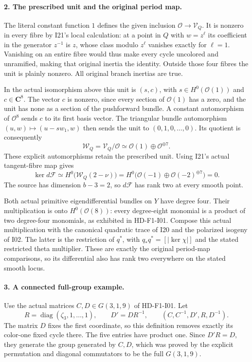 \paragraph{2. The prescribed unit and the original period map.}
The literal constant function $1$ defines the given
inclusion $\mathcal O\to\mathcal V_Q$. It is nonzero in
every fibre by I21's local calculation: at a point in $Q$
with $w=z^\ell$ its coefficient in the generator $z^{-1}$
is $z$, whose class modulo $z^\ell$ vanishes exactly for
$\ell=1$. Vanishing on an entire fibre would thus make
every cycle uncolored and unramified, making that original
inertia the identity. Outside those four fibres the unit
is plainly nonzero. All original branch inertias are true.

In the actual isomorphism above this unit is $(s,c)$,
with $s\in H^0(\mathcal O(1))$ and $c\in\mathbf C^8$.
The vector $c$ is nonzero, since every section of
$\mathcal O(1)$ has a zero, and the unit has none as a
section of the pushforward bundle. A constant automorphism
of $\mathcal O^8$ sends $c$ to its first basis vector.
The triangular bundle automorphism
$(u,w)\mapsto(u-s w_1,w)$ then sends the unit to
$(0,1,0,\ldots,0)$. Its quotient is consequently
\[
 \mathcal W_Q=\mathcal V_Q/\mathcal O
             \simeq\mathcal O(1)\oplus\mathcal O^{\oplus7}.
\]
These explicit automorphisms retain the prescribed unit.
Using I21's actual tangent-fibre map gives
\[
 \ker d\mathcal F
   \simeq H^0\bigl(\mathcal W_Q(2-\nu)\bigr)
   =H^0\bigl(\mathcal O(-1)\oplus
                         \mathcal O(-2)^{\oplus7}\bigr)=0.
\]
The source has dimension $b-3=2$, so $d\mathcal F$ has
rank two at every smooth point.

Both actual primitive eigendifferential bundles on $Y$
have degree four. Their multiplication is onto
$H^0(\mathcal O(8))$: every degree-eight monomial is a
product of two degree-four monomials, as exhibited in
HD-F1-I01. Compose this actual multiplication with the
canonical quadratic trace of I20 and the polarized
isogeny of I02. The latter is the restriction of $q^*$,
with $q_*q^*=[|\ker\chi|]$ and the stated restricted
theta multiplier. These are exactly the original
period-map comparisons, so its differential also has
rank two everywhere on the stated smooth locus.

\paragraph{3. A connected full-group example.}
Use the actual matrices $C,D\in G(3,1,9)$ of HD-F1-I01.
Let
\[
 R=\operatorname{diag}(\zeta_3,1,\ldots,1),
 \qquad D'=DR^{-1},
 \qquad (C,C^{-1},D',R,D^{-1}).
\]
The matrix $D$ fixes the first coordinate, so this
definition removes exactly its color-one fixed cycle
there. The five entries have product one. Since
$D'R=D$, they generate the group generated by $C,D$,
which was proved by the explicit permutation and diagonal
commutators to be the full $G(3,1,9)$.

